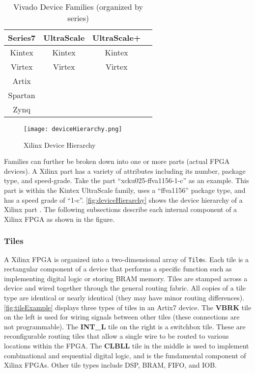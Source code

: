 \begin{table} [h!]
\caption{Vivado Device Families (organized by series)}
\label{tab:vivadoFamilies}
\vspace{-.15in}
\begin{center}
\begin{tabu}{ |c|c|c|c| }
\hline
\textbf{Series7} & \textbf{UltraScale} & \textbf{UltraScale+} \\
\hline
\hline
 Kintex & Kintex & Kintex \\
 Virtex & Virtex & Virtex \\
 Artix &  &  \\
 Spartan &  &  \\
 Zynq &  &  \\ 
\hline
\end{tabu}
\end{center}
\end{table}

\begin{figure}[b!]
 \centering
 \texttt{[image: deviceHierarchy.png]}
 \caption{Xilinx Device Hierarchy}
 \label{fig:deviceHierarchy}
\end{figure}

\noindent Families can further be broken down into one or more parts (actual
FPGA devices). A Xilinx part has a variety of attributes including its number,
package type, and speed-grade. Take the part ``xcku025-ffva1156-1-c'' as an
example. This part is within the Kintex UltraScale family, uses a ``ffva1156''
package type, and has a speed grade of ``1-c''. \autoref{fig:deviceHierarchy}
shows the device hierarchy of a Xilinx part . The following subsections describe
each internal component of a Xilinx FPGA as shown in the figure.

\subsubsection{Tiles}
A Xilinx FPGA is organized into a two-dimensional array of \texttt{Tile}s. Each
tile is a rectangular component of a device that performs a specific function
such as implementing digital logic or storing BRAM memory. Tiles are stamped
across a device  and wired together through the general routing fabric. All
copies of a tile type are identical or nearly identical (they may have minor
routing differences). \autoref{fig:tileExample} displays three types of tiles
in an Artix7 device. The \textbf{VBRK} tile on the left is used for wiring
signals between other tiles (these connections are not programmable). The 
\textbf{INT\_L} tile on the right is a switchbox tile. These are
reconfigurable routing tiles that allow a single wire to be routed to various
locations within the FPGA. The \textbf{CLBLL} tile in the middle is used
to implement combinational and sequential digital logic, and is the fundamental
component of Xilinx FPGAs. Other tile types include DSP, BRAM, FIFO, and IOB.

